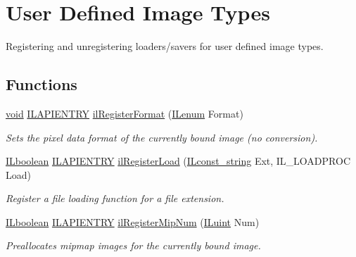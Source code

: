 \hypertarget{group__register}{\section{User Defined Image Types}
\label{group__register}
}


Registering and unregistering loaders/savers for user defined image types.  


\subsection*{Functions}
\begin{DoxyCompactItemize}
\item 
\hyperlink{_i_l_8h_a5530e04d947bcddd83639ea7940faf10}{void} \hyperlink{_i_l_8h_a69c08a8d06df986f7e46f209d131ef2f}{I\+L\+A\+P\+I\+E\+N\+T\+R\+Y} \hyperlink{group__register_gab16decaa97a48109c9decee6eaa65d2b}{il\+Register\+Format} (\hyperlink{group__il__types_ga62ca73445716183ef42b1f3906a45ed0}{I\+Lenum} Format)
\begin{DoxyCompactList}\small\item\em Sets the pixel data format of the currently bound image (no conversion). \end{DoxyCompactList}\item 
\hyperlink{group__il__types_gaa6aa7c95cfdc06b4d8601ef832b7bb0a}{I\+Lboolean} \hyperlink{_i_l_8h_a69c08a8d06df986f7e46f209d131ef2f}{I\+L\+A\+P\+I\+E\+N\+T\+R\+Y} \hyperlink{group__register_ga187276b36d61a040c08efdb6350b4824}{il\+Register\+Load} (\hyperlink{group__il__types_ga1aa1edc3eb344e14acacb02bade24a5a}{I\+Lconst\+\_\+string} Ext, I\+L\+\_\+\+L\+O\+A\+D\+P\+R\+O\+C Load)
\begin{DoxyCompactList}\small\item\em Register a file loading function for a file extension. \end{DoxyCompactList}\item 
\hyperlink{group__il__types_gaa6aa7c95cfdc06b4d8601ef832b7bb0a}{I\+Lboolean} \hyperlink{_i_l_8h_a69c08a8d06df986f7e46f209d131ef2f}{I\+L\+A\+P\+I\+E\+N\+T\+R\+Y} \hyperlink{group__register_ga7908a7a8f4b3544b76411300e1059bc9}{il\+Register\+Mip\+Num} (\hyperlink{group__il__types_gaff8e86a1072c8d7cfe387fb87c6ed8e1}{I\+Luint} Num)
\begin{DoxyCompactList}\small\item\em Preallocates mipmap images for the currently bound image. \end{DoxyCompactList}\item 

\end{DoxyCompactItemize}
